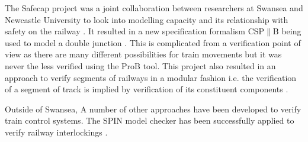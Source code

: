 The Safecap project was a joint collaboration between researchers at Swansea and Newcastle University to look into modelling capacity and its relationship with safety on the railway \cite{YI12}. It resulted in a new specification formalism CSP$\parallel$B being used to model a double junction \cite{FM12}. This is complicated from a verification point of view as there are many different possibilities for train movements but it was never the less verified using the ProB tool. This project also resulted in an approach to verify segments of railways in a modular fashion i.e. the verification of a segment of track is implied by verification of its constituent components \cite{FM12b}.

Outside of Swansea, A number of other approaches have been developed to verify train control systems. The SPIN model checker has been successfully applied to verify railway interlockings \cite{AC98}.


